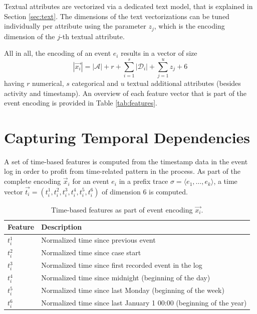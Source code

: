 Textual attributes are vectorized via a dedicated text model, that is explained in Section \ref{sec:text}.
The dimensions of the text vectorizations can be tuned individually per attribute using the parameter $z_j$, which is the encoding dimension of the $j$-th textual attribute.

All in all, the encoding of an event $e_i$ results in a vector of size
\begin{equation*}
|\vec{x_i}|= |\mathcal{A}| + r + \sum_{i=1}^{s} |\mathcal{D}_i| + \sum_{j=1}^{u} z_j + 6
\end{equation*}
having $r$ numerical, $s$ categorical and $u$ textual additional attributes (besides activity and timestamp).
An overview of each feature vector that is part of the event encoding is provided in Table \ref{tab:features}.

\section{Capturing Temporal Dependencies}\label{sec:time}

A set of time-based features is computed from the timestamp data in the event log in order to profit from time-related pattern in the process.
As part of the complete encoding $\vec{x}_i$ for an event $e_i$ in a prefix trace $\sigma = \langle e_1, \dots, e_k \rangle$, a time vector $\vec{t_i} = (t_i^1, t_i^2,t_i^3,t_i^4,t_i^5,t_i^6)$ of dimension 6 is computed.

\begin{table}[!htbp]
	\centering
	\begin{tabularx}{\textwidth}{l l}
		\toprule
		 \textbf{Feature} & \textbf{Description} \\
		 \midrule
		$t_i^1$ & Normalized time since previous event \\
		$t_i^2$ & Normalized time since case start\\
		$t_i^3$ & Normalized time since first recorded event in the log\\
		$t_i^4$ & Normalized time since midnight (beginning of the day)\\
		$t_i^5$ & Normalized time since last Monday (beginning of the week)\\
		$t_i^6$ & Normalized time since last January 1 00:00 (beginning of the year)\\
		\bottomrule
	\end{tabularx}
	\caption[Time-based features as part of the event encoding]{Time-based features as part of event encoding $\vec{x_i}$.}
	\label{tab:time-features}
\end{table}

